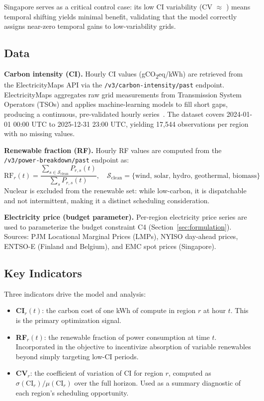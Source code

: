 Singapore serves as a critical control case: its low CI variability (CV $\approx$ ) means temporal shifting yields minimal benefit, validating that the model correctly assigns near-zero temporal gains to low-variability grids.

\subsection{Data}

\textbf{Carbon intensity (CI).}
Hourly CI values (gCO\textsubscript{2}eq/kWh) are retrieved from the ElectricityMaps API via the \texttt{/v3/carbon-intensity/past} endpoint.
ElectricityMaps aggregates raw grid measurements from Transmission System Operators (TSOs) and applies machine-learning models to fill short gaps, producing a continuous, pre-validated hourly series~\cite{radovanovic2023}.
The dataset covers 2024-01-01 00:00 UTC to 2025-12-31 23:00 UTC, yielding 17,544 observations per region with no missing values.

\textbf{Renewable fraction (RF).}
Hourly RF values are computed from the \texttt{/v3/power-breakdown/past} endpoint as:
\[
  \mathrm{RF}_r(t) = \frac{\sum_{s \in \mathcal{S}_{\mathrm{clean}}} P_{r,s}(t)}{\sum_{s} P_{r,s}(t)},
  \quad \mathcal{S}_{\mathrm{clean}} = \{\text{wind, solar, hydro, geothermal, biomass}\}
\]
Nuclear is excluded from the renewable set: while low-carbon, it is dispatchable and not intermittent, making it a distinct scheduling consideration.

\textbf{Electricity price (budget parameter).}
Per-region electricity price series are used to parameterize the budget constraint C4 (Section~\ref{sec:formulation}).
Sources: PJM Locational Marginal Prices (LMPs), NYISO day-ahead prices, ENTSO-E (Finland and Belgium), and EMC spot prices (Singapore).

\subsection{Key Indicators}

Three indicators drive the model and analysis:

\begin{itemize}[leftmargin=1.5em]
  \item \textbf{CI$_r(t)$}: the carbon cost of one kWh of compute in region $r$ at hour $t$.
        This is the primary optimization signal.
  \item \textbf{RF$_r(t)$}: the renewable fraction of power consumption at time $t$.
        Incorporated in the objective to incentivize absorption of variable renewables beyond simply targeting low-CI periods.
  \item \textbf{CV$_r$}: the coefficient of variation of CI for region $r$, computed as $\sigma(\mathrm{CI}_r) / \mu(\mathrm{CI}_r)$ over the full horizon.
        Used as a summary diagnostic of each region's scheduling opportunity.
\end{itemize}

